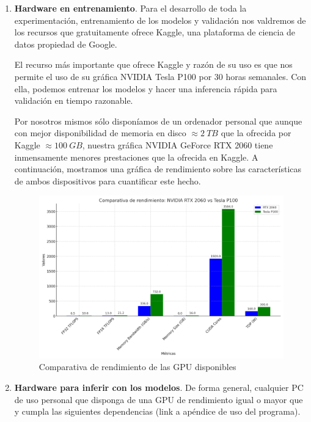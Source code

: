 \begin{enumerate}
	\item \textbf{Hardware en entrenamiento}. Para el desarrollo de toda la experimentación, entrenamiento de los modelos y validación nos valdremos de los recursos que gratuitamente ofrece Kaggle, una plataforma de ciencia de datos propiedad de Google. 
	
	El recurso más importante que ofrece Kaggle y razón de su uso es que nos permite el uso de su gráfica NVIDIA Tesla P100 por 30 horas semanales. Con ella, podemos entrenar los modelos y hacer una inferencia rápida para validación en tiempo razonable.
	
	Por nosotros mismos sólo disponíamos de un ordenador personal que aunque con mejor disponibilidad de memoria en disco $\approx 2\ TB$ que la ofrecida por Kaggle $\approx 100\ GB$, nuestra gráfica NVIDIA GeForce RTX 2060 tiene inmensamente menores prestaciones que la ofrecida en Kaggle. A continuación, mostramos una gráfica de rendimiento sobre las características de ambos dispositivos para cuantificar este hecho.
	
	\begin{figure}[H]
		\centering
		\includegraphics[width=1.0\linewidth]{imagenes/comparativa_rtx2060tesla.png}
		\caption{Comparativa de rendimiento de las GPU disponibles}
	\end{figure}
	
	
	\item \textbf{Hardware para inferir con los modelos}. De forma general, cualquier PC de uso personal que disponga de una GPU de rendimiento igual o mayor que   y cumpla las siguientes dependencias (link a apéndice de uso del programa). 
\end{enumerate}


